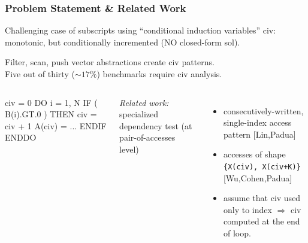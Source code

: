 \documentclass{beamer}
\newcommand{\emp}[1]{\textcolor{DikuRed}{ #1}}
\newcommand{\emphh}[1]{\textcolor{CosGreen}{ #1}}
\begin{document}
\begin{frame}[fragile,t]
  \frametitle{Problem Statement \& Related Work}

Challenging case of subscripts using
            \emp{``conditional induction variables''} {\sc civ}: 
            monotonic, but conditionally incremented 
            (NO closed-form sol).
\medskip

Filter, scan, push vector abstractions create {\sc civ} patterns.\\\smallskip
Five out of thirty ($\sim17\%$) benchmarks require {\sc civ} analysis.

\begin{columns}
\begin{colorcode}[fontsize=\small]
civ = 0
DO i = 1, N
  \emp{IF ( B(i).GT.0 ) THEN}
    \emp{civ = civ + 1}
    A(civ) = ...
  \emp{ENDIF} 
ENDDO
\end{colorcode}
\pause
\medskip

\emphh{\em Related work:} specialized dependency test (at pair-of-accesses level)\smallskip
\begin{itemize}
    \item consecutively-written, single-index access pattern [Lin,Padua]\smallskip
    \item accesses of shape {\tt \{X(civ), X(civ+K)\}} [Wu,Cohen,Padua]\smallskip
    \item assume that {\sc civ} used only to index $\Rightarrow$
            {\sc civ} computed at the end of loop.
\end{itemize}
\end{columns}

\end{frame}
\end{document}
